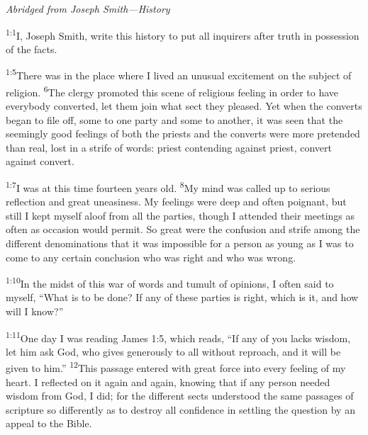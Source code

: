 \documentclass[openany,12pt,english]{book}
\newenvironment{para}{\par\pretolerance=100\tolerance=200\setlength{\emergencystretch}{0.6em}\relax}{\par}
\begin{document}
\begin{para}
    \begin{center}
        \itshape
        A\-bridged from Jo\-seph Smith---His\-to\-ry
    \end{center}
\end{para}


\begin{para}
    \textsuperscript{1:1}\thinspace{}I, Jo\-seph Smith, write this his\-to\-ry to put all inquirers af\-ter truth in pos\-ses\-sion of the facts.
\end{para}

\begin{para}
    \textsuperscript{1:5}\thinspace{}There was in the place where I lived an un\-u\-su\-al ex\-cite\-ment on the sub\-ject of re\-li\-gion.
    \textsuperscript{6}\thinspace{}The cler\-gy pro\-mot\-ed this scene of re\-li\-gious feel\-ing in or\-der to have eve\-ry\-bod\-y con\-vert\-ed, let them join what sect they pleased. Yet when the converts be\-gan to file off, some to one par\-ty and some to an\-oth\-er, it was seen that the seemingly good feelings of both the priests and the converts were more pre\-tend\-ed than re\-al, lost in a strife of words: priest contending against priest, con\-vert against con\-vert.
\end{para}

\begin{para}
    \textsuperscript{1:7}\thinspace{}I was at this time four\-teen years old.
    \textsuperscript{8}\thinspace{}My mind was called up to se\-ri\-ous re\-flec\-tion and great un\-eas\-i\-ness. My feelings were deep and of\-ten poign\-ant, but still I kept my\-self a\-loof from all the parties, though I attended their meetings as of\-ten as oc\-ca\-sion would per\-mit. So great were the con\-fu\-sion and strife a\-mong the dif\-fer\-ent denominations that it was im\-pos\-si\-ble for a per\-son as young as I was to come to any cer\-tain con\-clu\-sion who was right and who was wrong.
\end{para}

\begin{para}
    \textsuperscript{1:10}\thinspace{}In the midst of this war of words and tu\-mult of opinions, I of\-ten said to my\-self, “What is to be done? If any of these parties is right, which is it, and how will I know?”
\end{para}

\begin{para}
    \textsuperscript{1:11}\thinspace{}One day I was read\-ing James 1:5, which reads, “If any of you lacks wis\-dom, let him ask God, who gives gen\-er\-ous\-ly to all with\-out re\-proach, and it will be giv\-en to him.”
    \textsuperscript{12}\thinspace{}This pas\-sage entered with great force in\-to eve\-ry feel\-ing of my heart. I reflected on it again and again, know\-ing that if any per\-son needed wis\-dom from God, I did; for the dif\-fer\-ent sects un\-der\-stood the same passages of scrip\-ture so dif\-fer\-ent\-ly as to de\-stroy all con\-fi\-dence in set\-tling the ques\-tion by an ap\-peal to the Bible.
\end{para}
\end{document}
